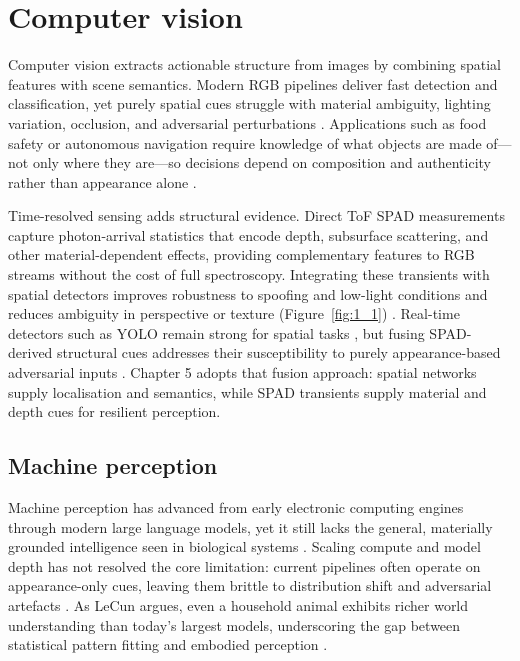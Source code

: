 \documentclass[12pt,a4paper,oneside]{report}
\let\oldsection\section
\renewcommand{\section}{\clearpage\oldsection}
\begin{document}
\newpage

\section{Computer vision}
\label{sec:computer_vision}

Computer vision extracts actionable structure from images by combining spatial features with scene semantics. Modern RGB pipelines deliver fast detection and classification, yet purely spatial cues struggle with material ambiguity, lighting variation, occlusion, and adversarial perturbations \cite{sharan2013,schwartz2013,rani2025}. Applications such as food safety or autonomous navigation require knowledge of what objects are made of—not only where they are—so decisions depend on composition and authenticity rather than appearance alone \cite{sharan2013,chen2024}.

Time-resolved sensing adds structural evidence. Direct ToF SPAD measurements capture photon-arrival statistics that encode depth, subsurface scattering, and other material-dependent effects, providing complementary features to RGB streams without the cost of full spectroscopy. Integrating these transients with spatial detectors improves robustness to spoofing and low-light conditions and reduces ambiguity in perspective or texture (Figure~\ref{fig:1_1}) \cite{chen2024}. Real-time detectors such as YOLO remain strong for spatial tasks \cite{redmon2015,redmon2018}, but fusing SPAD-derived structural cues addresses their susceptibility to purely appearance-based adversarial inputs \cite{rani2025}. Chapter 5 adopts that fusion approach: spatial networks supply localisation and semantics, while SPAD transients supply material and depth cues for resilient perception.

\subsection{Machine perception}
\label{subsec:machine_perception}

Machine perception has advanced from early electronic computing engines \cite{hartree1946} through modern large language models, yet it still lacks the general, materially grounded intelligence seen in biological systems \cite{chollet2019}. Scaling compute and model depth has not resolved the core limitation: current pipelines often operate on appearance-only cues, leaving them brittle to distribution shift and adversarial artefacts \cite{rani2025}. As LeCun argues, even a household animal exhibits richer world understanding than today’s largest models, underscoring the gap between statistical pattern fitting and embodied perception \cite{mims2024}.
\end{document}
